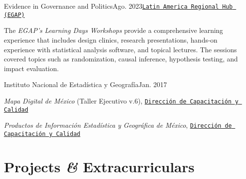 \documentclass[letter]{resume}
\begin{document}
\begin{content}



\begin{position}{Evidence in Governance and Politics}{Ago. 2023}{\normalfont\href{https://egap.org/project/learning-days-13-latin-america-regional-hub-workshop/}{\texttt{Latin America Regional Hub (EGAP)}}}{}{}
  \item The \emph{EGAP's Learning Days Workshops} provide a comprehensive learning experience that includes design clinics, research presentations, hands-on experience with statistical analysis software, and topical lectures. The sessions covered topics such as randomization, causal inference, hypothesis testing, and impact evaluation.
\end{position}

\begin{position}{Instituto Nacional de Estadística y Geografía}{Jan. 2017}{}{}{}
  \item \emph{Mapa Digital de México} (Taller Ejecutivo v.6), {\normalfont\href{https://drive.google.com/file/d/11P-V5IOrVxSAdumvZkqc6cNErlPHsWbA/view?usp=sharing}{\texttt{Dirección de Capacitación y Calidad}}}
  \item \emph{Productos de Información Estadística y Geográfica de México}, {\normalfont\href{https://drive.google.com/file/d/175VzjC148czXa4mLOryoo6QfAnEpCx_z/view?usp=sharing}{\texttt{Dirección de Capacitación y Calidad}}}
\end{position}

\end{content}


\section{Projects \textbf{\em\&} Extracurriculars} 
\end{document}
